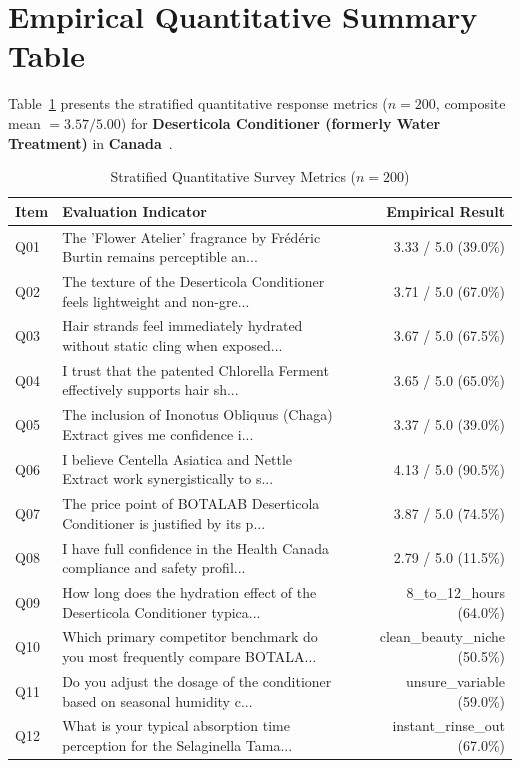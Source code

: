 \documentclass[10pt,twocolumn,a4paper]{article}
\begin{document}
\section{Empirical Quantitative Summary Table}
Table~\ref{tab:metrics} presents the stratified quantitative response metrics ($n = 200$, composite mean $= 3.57/5.00$) for \textbf{Deserticola Conditioner (formerly Water Treatment)} in \textbf{Canada}~\cite{ref_kaggle_doi,ref_hf_doi}.

\begin{table}[t]
\centering
\caption{Stratified Quantitative Survey Metrics ($n = 200$)}
\label{tab:metrics}
\small
\begin{tabularx}{\textwidth}{l X r}
\toprule
\textbf{Item} & \textbf{Evaluation Indicator} & \textbf{Empirical Result} \\
\midrule
Q01 & The 'Flower Atelier' fragrance by Frédéric Burtin remains perceptible an... & 3.33 / 5.0 (39.0\%) \\
Q02 & The texture of the Deserticola Conditioner feels lightweight and non-gre... & 3.71 / 5.0 (67.0\%) \\
Q03 & Hair strands feel immediately hydrated without static cling when exposed... & 3.67 / 5.0 (67.5\%) \\
Q04 & I trust that the patented Chlorella Ferment effectively supports hair sh... & 3.65 / 5.0 (65.0\%) \\
Q05 & The inclusion of Inonotus Obliquus (Chaga) Extract gives me confidence i... & 3.37 / 5.0 (39.0\%) \\
Q06 & I believe Centella Asiatica and Nettle Extract work synergistically to s... & 4.13 / 5.0 (90.5\%) \\
Q07 & The price point of BOTALAB Deserticola Conditioner is justified by its p... & 3.87 / 5.0 (74.5\%) \\
Q08 & I have full confidence in the Health Canada compliance and safety profil... & 2.79 / 5.0 (11.5\%) \\
Q09 & How long does the hydration effect of the Deserticola Conditioner typica... & 8\_to\_12\_hours (64.0\%) \\
Q10 & Which primary competitor benchmark do you most frequently compare BOTALA... & clean\_beauty\_niche (50.5\%) \\
Q11 & Do you adjust the dosage of the conditioner based on seasonal humidity c... & unsure\_variable (59.0\%) \\
Q12 & What is your typical absorption time perception for the Selaginella Tama... & instant\_rinse\_out (67.0\%) \\

\end{tabularx}
\end{table}
\end{document}
